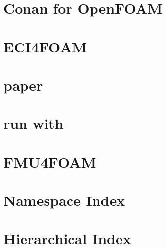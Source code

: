\documentclass[twoside]{book}
\newcommand{\+}{\discretionary{\mbox{\scriptsize$\hookleftarrow$}}{}{}}
\begin{document}
\chapter{Conan for Open\+F\+O\+AM}
\label{md__home_carlo_data_GeN-Foam_GeN-Foam_ffn_GeN-Foam_GeN-Foam_FMU4FOAM_ECI4FOAM_OpenFOAMGen_README}

\chapter{E\+C\+I4\+F\+O\+AM}
\label{md__home_carlo_data_GeN-Foam_GeN-Foam_ffn_GeN-Foam_GeN-Foam_FMU4FOAM_ECI4FOAM_README}

\chapter{paper}
\label{md__home_carlo_data_GeN-Foam_GeN-Foam_ffn_GeN-Foam_GeN-Foam_FMU4FOAM_paper_paper}

\chapter{run with}
\label{md__home_carlo_data_GeN-Foam_GeN-Foam_ffn_GeN-Foam_GeN-Foam_FMU4FOAM_paper_readme}

\chapter{F\+M\+U4\+F\+O\+AM}
\label{md__home_carlo_data_GeN-Foam_GeN-Foam_ffn_GeN-Foam_GeN-Foam_FMU4FOAM_README}

\chapter{Namespace Index}

\chapter{Hierarchical Index}

\end{document}

